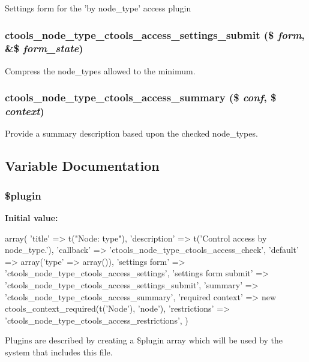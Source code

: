 \label{node__type_8inc_a6426607ca26ccc9d6bacd1ef24ee5f56}
Settings form for the 'by node\_\-type' access plugin \hypertarget{node__type_8inc_ad4fb4701b51cdb448f1f41e6a2b07b33}{
\subsubsection[{ctools\_\-node\_\-type\_\-ctools\_\-access\_\-settings\_\-submit}]{\setlength{\rightskip}{0pt plus 5cm}ctools\_\-node\_\-type\_\-ctools\_\-access\_\-settings\_\-submit (\$ {\em form}, \/  \&\$ {\em form\_\-state})}}
\label{node__type_8inc_ad4fb4701b51cdb448f1f41e6a2b07b33}
Compress the node\_\-types allowed to the minimum. \hypertarget{node__type_8inc_aac38c594ff33c15c3d5fa6ee686d7d1e}{
\subsubsection[{ctools\_\-node\_\-type\_\-ctools\_\-access\_\-summary}]{\setlength{\rightskip}{0pt plus 5cm}ctools\_\-node\_\-type\_\-ctools\_\-access\_\-summary (\$ {\em conf}, \/  \$ {\em context})}}
\label{node__type_8inc_aac38c594ff33c15c3d5fa6ee686d7d1e}
Provide a summary description based upon the checked node\_\-types. 

\subsection{Variable Documentation}
\hypertarget{node__type_8inc_ada8a7130088351710bb02ed622d6bf65}{
\subsubsection[{\$plugin}]{\setlength{\rightskip}{0pt plus 5cm}\$plugin}}
\label{node__type_8inc_ada8a7130088351710bb02ed622d6bf65}
{\bfseries Initial value:}
\begin{DoxyCode}
 array(
  'title' => t("Node: type"),
  'description' => t('Control access by node_type.'),
  'callback' => 'ctools_node_type_ctools_access_check',
  'default' => array('type' => array()),
  'settings form' => 'ctools_node_type_ctools_access_settings',
  'settings form submit' => 'ctools_node_type_ctools_access_settings_submit',
  'summary' => 'ctools_node_type_ctools_access_summary',
  'required context' => new ctools_context_required(t('Node'), 'node'),
  'restrictions' => 'ctools_node_type_ctools_access_restrictions',
)
\end{DoxyCode}
Plugins are described by creating a \$plugin array which will be used by the system that includes this file. 